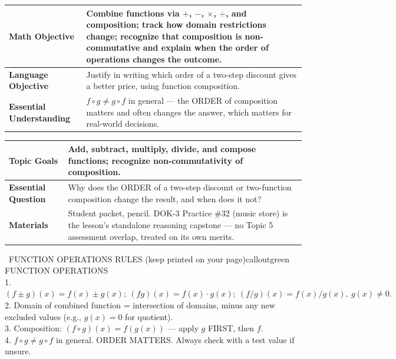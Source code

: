 \documentclass[11pt]{article}
\newcommand{\lessonrow}[2]{\textbf{#1} & #2 \\ \hline}
\begin{document}

{\small
\renewcommand{\arraystretch}{1.25}
\noindent\begin{tabular}{|p{1.8in}|p{4.8in}|}
\hline
\lessonrow{Math Objective}{Combine functions via \(+\), \(-\), \(\times\), \(\div\), and composition; track how domain restrictions change; recognize that composition is non-commutative and explain when the order of operations changes the outcome.}
\lessonrow{Language Objective}{Justify in writing which order of a two-step discount gives a better price, using function composition.}
\lessonrow{Essential Understanding}{\(f\circ g \neq g\circ f\) in general --- the ORDER of composition matters and often changes the answer, which matters for real-world decisions.}
\end{tabular}
}

{\small
\renewcommand{\arraystretch}{1.25}
\noindent\begin{tabular}{|p{1.8in}|p{4.8in}|}
\hline
\lessonrow{Topic Goals}{Add, subtract, multiply, divide, and compose functions; recognize non-commutativity of composition.}
\lessonrow{Essential Question}{Why does the ORDER of a two-step discount or two-function composition change the result, and when does it not?}
\lessonrow{Materials}{Student packet, pencil. DOK-3 Practice \#32 (music store) is the lesson's standalone reasoning capstone --- no Topic 5 assessment overlap, treated on its own merits.}
\end{tabular}
}


\begin{callout}{\IconBook\ FUNCTION OPERATIONS RULES (keep printed on your page)}{calloutgreen}
FUNCTION OPERATIONS\\
1. \((f\pm g)(x) = f(x)\pm g(x);\ (fg)(x) = f(x)\cdot g(x);\ (f/g)(x) = f(x)/g(x),\ g(x)\neq 0.\)\\
2. Domain of combined function = intersection of domains, minus any new excluded values (e.g., \(g(x)=0\) for quotient).\\
3. Composition: \((f\circ g)(x) = f(g(x))\) --- apply \(g\) FIRST, then \(f\).\\
4. \(f\circ g \neq g\circ f\) in general. ORDER MATTERS. Always check with a test value if unsure.
\end{callout}
\end{document}
